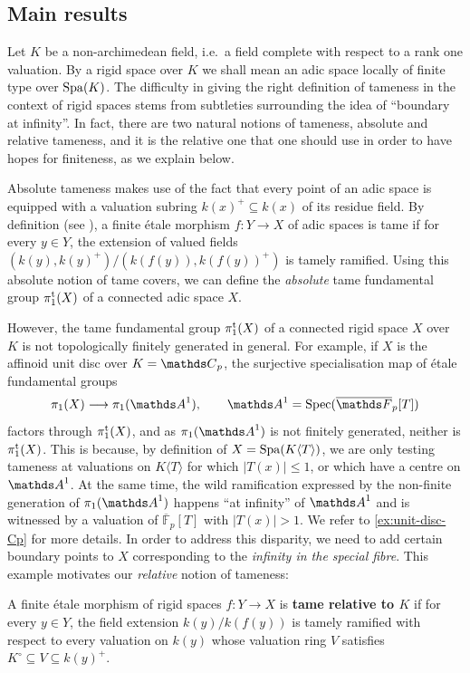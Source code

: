 \subsection*{Main results}

Let $K$ be a non-archimedean field, i.e.\ a field complete with respect to a rank one valuation. By a rigid space over $K$ we shall mean an adic space locally of finite type over $\operatorname{Spa}(K)$. The difficulty in giving the right definition of tameness in the context of rigid spaces stems from subtleties surrounding the idea of ``boundary at infinity''. In fact, there are two natural notions of tameness, absolute and relative tameness, and it is the relative one that one should use in order to have hopes for finiteness, as we explain below.

Absolute tameness makes use of the fact that every point of an adic space is equipped with a valuation subring $k(x)^+\subseteq k(x)$ of its residue field. 
By definition (see \cite[Definition~3.3]{Hubner2021:AdicTameSite}), a finite \'etale morphism $f\colon Y\to X$ of adic spaces is tame if for every $y\in Y$, the extension of valued fields $(k(y), k(y)^+)/(k(f(y)), k(f(y))^+)$ is tamely ramified. Using this absolute notion of tame covers, we can define the \emph{absolute} tame fundamental group $\pi_1^{\mathrm{t}}(X)$ of a connected adic space $X$. 

However, the tame fundamental group $\pi_1^{\mathrm{t}}(X)$ of a connected rigid space $X$ over $K$ is not topologically finitely generated in general. For example, if $X$ is the affinoid unit disc over $K = \bC_p$, the surjective specialisation map of étale fundamental groups
\[ 
    \pi_1(X) \la \pi_1(\bA^1), \qquad \bA^1 = \Spec(\overline{\mathbb{F}}_p[T])
\]
factors through $\pi_1^{\mathrm{t}}(X)$, and as $\pi_1(\bA^1)$ is not finitely generated, neither is $\pi_1^{\mathrm{t}}(X)$. This is because, by definition of $X = \operatorname{Spa}(K\langle T\rangle)$, we are only testing tameness at valuations on $K\langle T\rangle$ for which $|T(x)|\leq 1$, or which have a centre on $\bA^1$. At the same time, the wild ramification expressed by the non-finite generation of $\pi_1(\bA^1)$ happens ``at infinity'' of $\bA^1$ and is witnessed by a valuation of $\overline{\mathbb{F}}_p[T]$ with $|T(x)|>1$. We refer to \cref{ex:unit-disc-Cp} for more details. In order to address this disparity, we need to add certain boundary points to $X$ corresponding to the \emph{infinity in the special fibre}. This example motivates our \emph{relative} notion of tameness:

\begin{defiABC}
    A finite \'etale morphism of rigid spaces $f\colon Y\to X$ is {\bf tame relative to $K$} if for every $y\in Y$, the field extension $k(y)/k(f(y))$ is tamely ramified with respect to every valuation on $k(y)$ whose valuation ring $V$ satisfies $K^\circ\subseteq V\subseteq k(y)^+$.
\end{defiABC}

